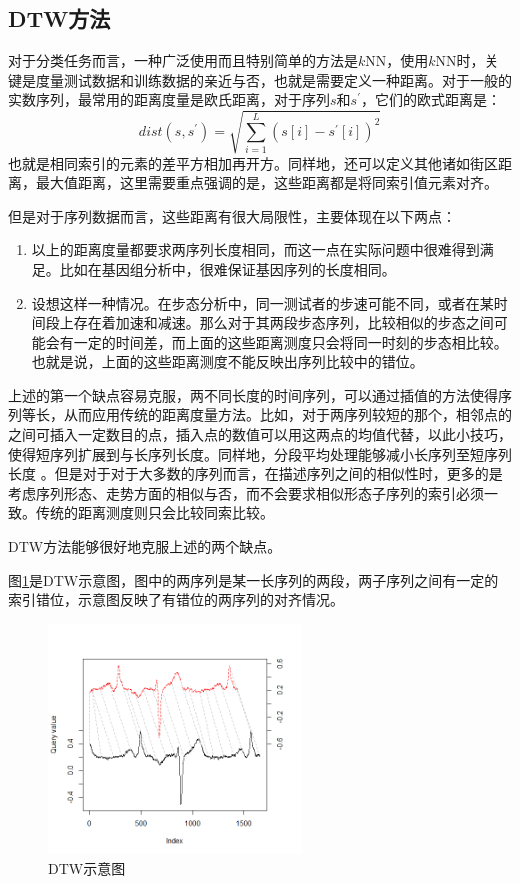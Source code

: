 \subsection{DTW方法}
对于分类任务而言，一种广泛使用而且特别简单的方法是$k$NN，使用$k$NN时，关键是度量测试数据和训练数据的亲近与否，也就是需要定义一种距离。对于一般的实数序列，最常用的距离度量是欧氏距离，对于序列$s$和$s^{'}$，它们的欧式距离是：
\begin{equation}\label{equ:1}
  dist\left( {s,{s^{'}}} \right) = \sqrt {\sum\limits_{i = 1}^L {{{\left( {s\left[ i \right] - {s^{'}}\left[ i \right]} \right)}^2}} }
\end{equation}
也就是相同索引的元素的差平方相加再开方。同样地，还可以定义其他诸如街区距离，最大值距离，这里需要重点强调的是，这些距离都是将同索引值元素对齐。

但是对于序列数据而言，这些距离有很大局限性，主要体现在以下两点：
\begin{enumerate}
  \item 以上的距离度量都要求两序列长度相同，而这一点在实际问题中很难得到满足。比如在基因组分析中，很难保证基因序列的长度相同。
  \item 设想这样一种情况。在步态分析中，同一测试者的步速可能不同，或者在某时间段上存在着加速和减速。那么对于其两段步态序列，比较相似的步态之间可能会有一定的时间差，而上面的这些距离测度只会将同一时刻的步态相比较。也就是说，上面的这些距离测度不能反映出序列比较中的错位。
\end{enumerate}

上述的第一个缺点容易克服，两不同长度的时间序列，可以通过插值的方法使得序列等长，从而应用传统的距离度量方法。比如，对于两序列较短的那个，相邻点的之间可插入一定数目的点，插入点的数值可以用这两点的均值代替，以此小技巧，使得短序列扩展到与长序列长度。同样地，分段平均处理能够减小长序列至短序列长度 \cite{Keogh2000}。但是对于对于大多数的序列而言，在描述序列之间的相似性时，更多的是考虑序列形态、走势方面的相似与否，而不会要求相似形态子序列的索引必须一致。传统的距离测度则只会比较同索比较。

DTW方法能够很好地克服上述的两个缺点。

图\ref{fig：1}是DTW示意图，图中的两序列是某一长序列的两段，两子序列之间有一定的索引错位，示意图反映了有错位的两序列的对齐情况\cite{Giorgino2009}。
\begin{figure}[h]
  \centering
  \includegraphics[width=0.6\textwidth]{./figure/two_way_plot.png}
  \caption{DTW示意图}\label{fig：1}
\end{figure}

